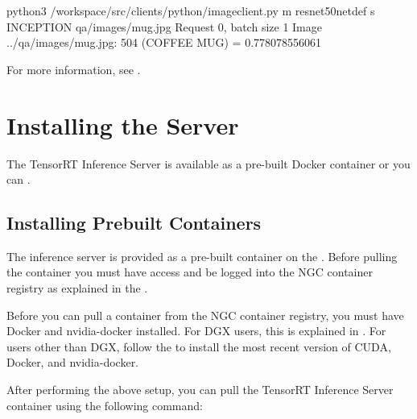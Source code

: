\documentclass[letterpaper,10pt,english]{sphinxmanual}
\begin{document}
\begin{sphinxVerbatim}[commandchars=\\\{\}]
\PYGZdl{} python3 /workspace/src/clients/python/image\PYGZus{}client.py \PYGZhy{}m resnet50\PYGZus{}netdef \PYGZhy{}s INCEPTION qa/images/mug.jpg
Request 0, batch size 1
Image \PYGZsq{}../qa/images/mug.jpg\PYGZsq{}:
    504 (COFFEE MUG) = 0.778078556061
\end{sphinxVerbatim}

For more information, see {\hyperref[\detokenize{client:section-image-classification-example}]{}}.


\chapter{Installing the Server}
\label{\detokenize{install:installing-the-server}}\label{\detokenize{install::doc}}
The TensorRT Inference Server is available as a pre-built Docker
container or you can {\hyperref[\detokenize{build:section-building-the-server}]{}}.


\section{Installing Prebuilt Containers}
\label{\detokenize{install:installing-prebuilt-containers}}\label{\detokenize{install:section-installing-prebuilt-containers}}
The inference server is provided as a pre-built container on the
.  Before pulling the
container you must have access and be logged into the NGC container
registry as explained in the .

Before you can pull a container from the NGC container registry, you
must have Docker and nvidia-docker installed. For DGX users, this is
explained in .
For users other than DGX, follow the  to install
the most recent version of CUDA, Docker, and nvidia-docker.

After performing the above setup, you can pull the TensorRT Inference
Server container using the following command:
\end{document}

